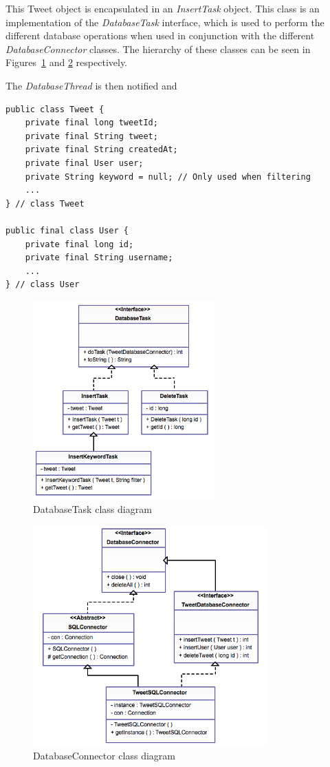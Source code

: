 This Tweet object is encapsulated in an \emph{InsertTask} object. This class is an implementation of the \emph{DatabaseTask} interface, which is used to perform the different database operations when used in conjunction with the different \emph{DatabaseConnector} classes. The hierarchy of these classes can be seen in Figures~\ref{fig:dbtask} and \ref{fig:dbcon} respectively.

The \emph{DatabaseThread} is then notified and 
\begin{lstlisting}[caption=Tweet and User class properties, label=lst:tweetuser]
public class Tweet {
    private final long tweetId;
    private final String tweet;
    private final String createdAt;
    private final User user;
    private String keyword = null; // Only used when filtering
    ...
} // class Tweet

public final class User {
    private final long id;
    private final String username;
    ...
} // class User 
\end{lstlisting}


\begin{figure}[h]
\begin{center}
\includegraphics[width=7cm]{dbtask}
\end{center}
\caption{DatabaseTask class diagram}
\label{fig:dbtask}
\end{figure}

\begin{figure}[h]
\begin{center}
\includegraphics[width=9cm]{dbcon}
\end{center}
\caption{DatabaseConnector class diagram}
\label{fig:dbcon}
\end{figure}




